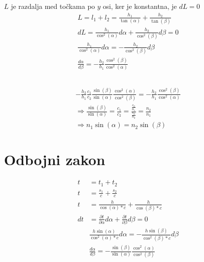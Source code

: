 \documentclass[a4paper,12pt]{article}
\begin{document}
\subsection{}
$L$ je razdalja med točkama po $y$ osi, ker je konstantna, je $dL = 0$
\begin{align}
    L = l_1 + l_2 = \frac{h_1}{\tan(\alpha)} + \frac{h_2}{\tan(\beta)}             \\
    dL = \frac{h_1}{\cos^2(\alpha)} d\alpha + \frac{h_2}{\cos^2(\beta)} d\beta = 0 \\
    \frac{h_1}{\cos^2(\alpha)} d\alpha = -\frac{h_2}{\cos^2(\beta)} d\beta         \\
    \frac{d \alpha}{d \beta} = -\frac{h_2}{h_1} \frac{\cos^2(\beta)}{\cos^2(\alpha)}
\end{align}

\subsection{}
\begin{align}
    -\frac{h_2}{h_1} \frac{c_1}{c_2} \frac{\sin(\beta)}{\sin(\alpha)} \frac{\cos^2(\alpha)}{\cos^2(\beta)} = - \frac{h_2}{h_1} \frac{\cos^2(\beta)}{\cos^2(\alpha)} \\
    \Rightarrow \frac{\sin(\beta)}{\sin(\alpha)} = \frac{c_1}{c_2} = \frac{\frac{c_0}{n_1}}{\frac{c_0}{n_2}} = \frac{n_2}{n_1}                                      \\
    \Rightarrow n_1 \sin(\alpha) = n_2 \sin(\beta)
\end{align}

\newpage
\section{Odbojni zakon} \label{sec:odbojni_zakon}
\begin{align}
    t  & = t_1 + t_2                                                                                         \\
    t  & = \frac{s_1}{c} + \frac{s_2}{c}                                                                     \\
    t  & = \frac{h}{\cos(\alpha) * c} + \frac{h}{\cos(\beta) * c}                                            \\
    dt & = \frac{\partial t}{\partial \alpha} d\alpha + \frac{\partial t}{\partial \beta} d\beta = 0         \\
       & \frac{h \sin(\alpha)}{\cos^2(\alpha) * c} d\alpha = -\frac{h \sin(\beta)}{\cos^2(\beta) * c} d\beta \\
       & \frac{d \alpha}{d \beta} = -\frac{\sin(\beta)}{\sin(\alpha)} \frac{\cos^2(\alpha)}{\cos^2(\beta)}
\end{align}
\end{document}
